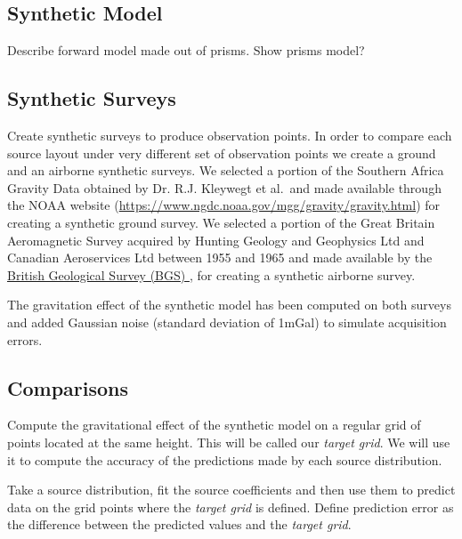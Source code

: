 \documentclass[twocolumn]{article}
\begin{document}
\subsection{Synthetic Model}

Describe forward model made out of prisms.
Show prisms model?

\subsection{Synthetic Surveys}

Create synthetic surveys to produce observation points.
In order to compare each source layout under very different set of observation points we
create a ground and an airborne synthetic surveys.
We selected a portion of the Southern Africa Gravity Data obtained by Dr. R.J. Kleywegt
et al.\ and made available through the NOAA website
(\url{https://www.ngdc.noaa.gov/mgg/gravity/gravity.html}) for creating a synthetic
ground survey.
We selected a portion of the Great Britain Aeromagnetic Survey acquired by Hunting
Geology and Geophysics Ltd and Canadian Aeroservices Ltd between 1955 and 1965 and made
available by the
\href{
    https://www.bgs.ac.uk/products/geophysics/aeromagneticRegional.html
    }{
    British Geological Survey (BGS)
}, for creating a synthetic airborne survey.

The gravitation effect of the synthetic model has been computed on both surveys and
added Gaussian noise (standard deviation of 1mGal) to simulate acquisition errors.

\subsection{Comparisons}


Compute the gravitational effect of the synthetic model on a regular grid of points
located at the same height.
This will be called our \emph{target grid}.
We will use it to compute the accuracy of the predictions made by each source
distribution.

Take a source distribution, fit the source coefficients and then use them to predict
data on the grid points where the \emph{target grid} is defined.
Define prediction error as the difference between the predicted values and the
\emph{target grid}.
\end{document}
